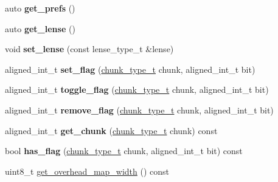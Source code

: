 \begin{DoxyCompactItemize}
auto {\bfseries get\+\_\+prefs} ()
\item 
\mbox{\label{classmods_1_1player_a760f4dfe08f944e64ba64faf3a1b41bd}} 
auto {\bfseries get\+\_\+lense} ()
\item 
\mbox{\label{classmods_1_1player_af920cb9294852247b743416b11962bdc}} 
void {\bfseries set\+\_\+lense} (const lense\+\_\+type\+\_\+t \&lense)
\item 
\mbox{\label{classmods_1_1player_a5ae234a904fde59efe863101c0fa8569}} 
aligned\+\_\+int\+\_\+t {\bfseries set\+\_\+flag} (\hyperlink{classmods_1_1player_a98e6f1c1529e3034d1c6e9a48475bc6b}{chunk\+\_\+type\+\_\+t} chunk, aligned\+\_\+int\+\_\+t bit)
\item 
\mbox{\label{classmods_1_1player_a8e3f6ee3fec9c25cdfbc8900dd7dd8de}} 
aligned\+\_\+int\+\_\+t {\bfseries toggle\+\_\+flag} (\hyperlink{classmods_1_1player_a98e6f1c1529e3034d1c6e9a48475bc6b}{chunk\+\_\+type\+\_\+t} chunk, aligned\+\_\+int\+\_\+t bit)
\item 
\mbox{\label{classmods_1_1player_ac82ced6921af9adc44e20e8d35bb423f}} 
aligned\+\_\+int\+\_\+t {\bfseries remove\+\_\+flag} (\hyperlink{classmods_1_1player_a98e6f1c1529e3034d1c6e9a48475bc6b}{chunk\+\_\+type\+\_\+t} chunk, aligned\+\_\+int\+\_\+t bit)
\item 
\mbox{\label{classmods_1_1player_a4a136f9de177df78bf7a8253e1068082}} 
aligned\+\_\+int\+\_\+t {\bfseries get\+\_\+chunk} (\hyperlink{classmods_1_1player_a98e6f1c1529e3034d1c6e9a48475bc6b}{chunk\+\_\+type\+\_\+t} chunk) const
\item 
\mbox{\label{classmods_1_1player_a553683497aed80e8768107b9c12b544e}} 
bool {\bfseries has\+\_\+flag} (\hyperlink{classmods_1_1player_a98e6f1c1529e3034d1c6e9a48475bc6b}{chunk\+\_\+type\+\_\+t} chunk, aligned\+\_\+int\+\_\+t bit) const
\item 
uint8\+\_\+t \hyperlink{classmods_1_1player_a05b78e56ec3b207c2ebd5396b4e3bd65}{get\+\_\+overhead\+\_\+map\+\_\+width} () const
\item 
\mbox{\label{classmods_1_1player_a6bbc06149ecfe73e3968a8872e797707}} 

\end{DoxyCompactItemize}

